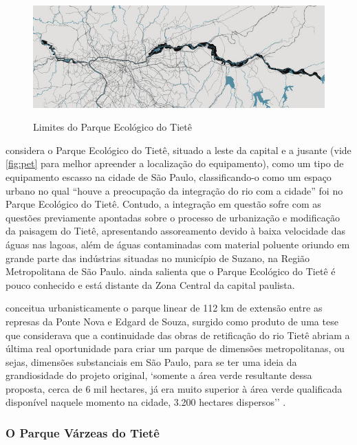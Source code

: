 \documentclass[
article,			%
11pt,				%
oneside,			%
a4paper,			%
english,			%
brazil,				%
sumario=tradicional
]{abntex2}
\begin{document}
	\begin{figure}
		\centering
		\caption{Limites do Parque Ecológico do Tietê}
		\includegraphics[width=1.0\linewidth]{img/leitao2014_p158a}
		\label{fig:pet}
	\end{figure}
	
	 considera o Parque Ecológico do Tietê, situado a leste da capital e a jusante (vide \autoref{fig:pet} para melhor apreender a localização do equipamento), como um tipo de equipamento escasso na cidade de São Paulo, classificando-o como um espaço urbano no qual ``houve a preocupação da integração do rio com a cidade'' foi no Parque Ecológico do Tietê. Contudo, a integração em questão sofre com as questões previamente apontadas sobre o processo de urbanização e modificação da paisagem do Tietê, apresentando assoreamento devido à baixa velocidade das águas nas lagoas, além de águas contaminadas com material poluente oriundo em grande parte das indústrias situadas no município de Suzano, na Região Metropolitana de São Paulo. \cite[p. 183]{brocaneli2007a} ainda salienta que o Parque Ecológico do Tietê é pouco conhecido e está distante da Zona Central da capital paulista.
	
	 conceitua urbanisticamente o parque linear de 112 km de extensão entre as represas da Ponte Nova e Edgard de Souza, surgido como produto de uma tese que considerava que a continuidade das obras de retificação do rio Tietê abriam a última real oportunidade para criar um parque de dimensões metropolitanas, ou sejas, dimensões substanciais em São Paulo, para se ter uma ideia da grandiosidade do projeto original, `somente a área verde resultante dessa proposta, cerca de 6 mil hectares, já era muito superior à área verde qualificada disponível naquele momento na cidade,	3.200 hectares dispersos'' \cite[p. 111]{leitao2014a}.
	
	\subsubsection{O Parque Várzeas do Tietê} \label{s3:pvt}
	
\end{document}
